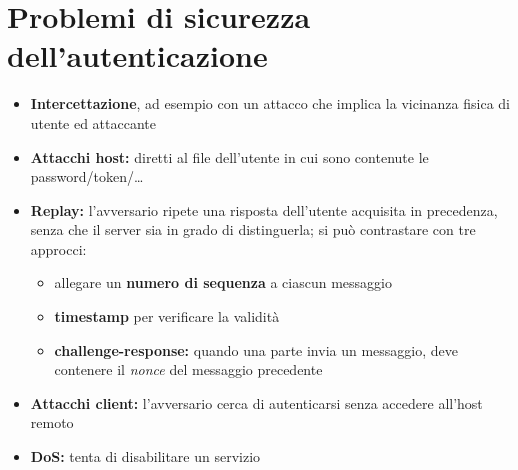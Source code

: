 \section{Problemi di sicurezza dell'autenticazione}
\begin{itemize}
    \item \textbf{Intercettazione}, ad esempio con un attacco che implica la vicinanza fisica di utente ed attaccante
    \item \textbf{Attacchi host:} diretti al file dell'utente in cui sono contenute le password/token/\dots
    \item \textbf{Replay:} l'avversario ripete una risposta dell'utente acquisita in precedenza, senza che il server 
    sia in grado di distinguerla; si può contrastare con tre approcci:
    \begin{itemize}
        \item allegare un \textbf{numero di sequenza} a ciascun messaggio
        \item \textbf{timestamp} per verificare la validità
        \item \textbf{challenge-response:} quando una parte invia un messaggio, deve contenere il
        \textit{nonce} del messaggio precedente
    \end{itemize}
    \item \textbf{Attacchi client:} l'avversario cerca di autenticarsi senza accedere all'host remoto 
    \item \textbf{DoS:} tenta di disabilitare un servizio 
\end{itemize}






